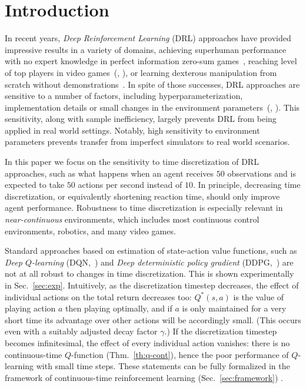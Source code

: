 
\section{Introduction}
\label{sec:intro}
In recent years, \emph{Deep Reinforcement Learning} (DRL) approaches have
provided impressive results in a variety of domains, achieving superhuman
performance with no expert knowledge in perfect information zero-sum
games~\cite{alphazero}, reaching level of top players in video
games~(\citealt{openai_five}, \citealt{dqn}), or learning dexterous manipulation
from scratch without demonstrations~\cite{hand_control}. 
In spite of those successes, DRL approaches are
sensitive to a number of factors, including hyperparameterization,
implementation details or small changes in the environment
parameters~(\citealt{drl_matter}, \citealt{drl_matter_bis}). This sensitivity,
along with sample inefficiency, largely prevents DRL from being applied in real
world settings. Notably, high sensitivity to environment parameters prevents
transfer from imperfect simulators to real world scenarios.

In this paper we focus on the sensitivity to time discretization of DRL
approaches, such as what happens when an agent receives $50$ observations
and is expected to take $50$ actions per second instead of $10$.
In principle, decreasing time discretization, or equivalently
shortening reaction time, should only improve agent performance.
Robustness to time discretization is especially relevant in
\emph{near-continuous} environments, which includes most continuous
control environments, robotics, and many video games.  

Standard approaches based on estimation of state-action
value functions, such as
\emph{Deep $Q$-learning} (DQN,~\citealt{dqn}) and \emph{Deep deterministic policy
gradient} (DDPG,~\citealt{ddpg}) are not at all robust to changes in time discretization. This is shown experimentally in Sec.~\ref{sec:exp}. 
Intuitively, as the discretization timestep
decreases, the effect of individual actions on the total return decreases
too: $Q^*(s,a)$ is the value of playing action $a$ then playing optimally,
and if $a$ is only maintained for a very short time its advantage over
other actions will be accordingly small. (This occurs even with a
suitably adjusted decay factor $\gamma$.)
If the discretization timestep becomes infinitesimal, the effect of every
individual action vanishes: there is no continuous-time $Q$-function
(Thm.~\ref{th:q-cont}), hence the poor performance of $Q$-learning with
small time steps. These statements can be fully formalized in the framework
of continuous-time reinforcement learning (Sec.~\ref{sec:framework})
\cite{cont_rl, adv_upd}. 

